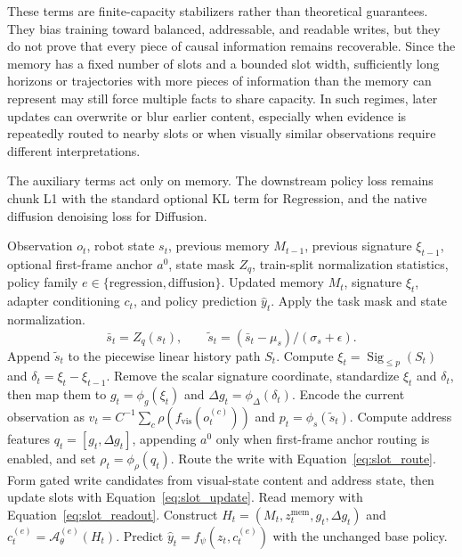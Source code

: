 \documentclass{article}
\begin{document}
These terms are finite-capacity stabilizers rather than theoretical guarantees. They bias training toward balanced, addressable, and readable writes, but they do not prove that every piece of causal information remains recoverable. Since the memory has a fixed number of slots and a bounded slot width, sufficiently long horizons or trajectories with more pieces of information than the memory can represent may still force multiple facts to share capacity. In such regimes, later updates can overwrite or blur earlier content, especially when evidence is repeatedly routed to nearby slots or when visually similar observations require different interpretations.

The auxiliary terms act only on memory. The downstream policy loss remains chunk L1 with the standard optional KL term for Regression, and the native diffusion denoising loss for Diffusion.

\begin{algorithm}[H]
    \small
    \caption{Causal TRACE memory update and adapter conditioning.}
    \label{alg:online_update}
    \begin{algorithmic}[1]
        \Require Observation $o_t$, robot state $s_t$, previous memory $M_{t-1}$, previous signature $\xi_{t-1}$, optional first-frame anchor $a^0$, state mask $Z_q$, train-split normalization statistics, policy family $e\in\{\mathrm{regression},\mathrm{diffusion}\}$.
        \Ensure Updated memory $M_t$, signature $\xi_t$, adapter conditioning $c_t$, and policy prediction $\hat y_t$.
        \State Apply the task mask and state normalization.
        \[
            \bar s_t=Z_q(s_t),
            \qquad
            \tilde s_t=(\bar s_t-\mu_s)/(\sigma_s+\epsilon).
        \]
        \State Append $\tilde s_t$ to the piecewise linear history path $S_t$.
        \State Compute $\xi_t=\operatorname{Sig}_{\leq p}(S_t)$ and $\delta_t=\xi_t-\xi_{t-1}$.
        \State Remove the scalar signature coordinate, standardize $\xi_t$ and $\delta_t$, then map them to $g_t=\phi_g(\xi_t)$ and $\Delta g_t=\phi_\Delta(\delta_t)$.
        \State Encode the current observation as $v_t=C^{-1}\sum_c\rho(f_{\mathrm{vis}}(o_t^{(c)}))$ and $p_t=\phi_s(\tilde s_t)$.
        \State Compute address features $q_t=[g_t,\Delta g_t]$, appending $a^0$ only when first-frame anchor routing is enabled, and set $\rho_t=\phi_{\rho}(q_t)$.
        \State Route the write with Equation~\ref{eq:slot_route}.
        \State Form gated write candidates from visual-state content and address state, then update slots with Equation~\ref{eq:slot_update}.
        \State Read memory with Equation~\ref{eq:slot_readout}.
        \State Construct $H_t=(M_t,z_t^{\mathrm{mem}},g_t,\Delta g_t)$ and $c_t^{(e)}=\mathcal{A}_{\theta}^{(e)}(H_t)$.
        \State Predict $\hat y_t=f_\psi(z_t,c_t^{(e)})$ with the unchanged base policy.
    \end{algorithmic}
\end{algorithm}
\end{document}
